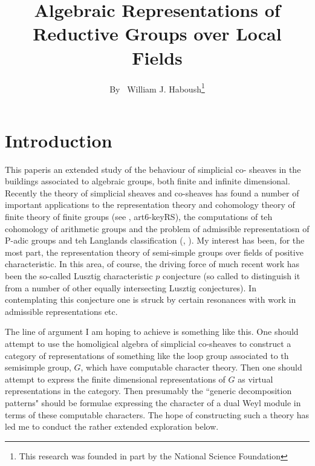 \title{Algebraic Representations of Reductive Groups over Local Fields}

\author{By~ William J. Haboush\footnote{This research was founded in part by the National Science Foundation}}

\date{}
\maketitle



\section*{Introduction}

This paper\pageoriginale is an extended study of the behaviour of simplicial co- sheaves in the buildings associated to algebraic groups, both finite and infinite dimensional. Recently the theory of simplicial sheaves and co-sheaves has found a number of important applications to the representation theory and cohomology theory of finite theory of finite groups (see \cite{art6-keyT}, art6-keyRS), the computations of teh cohomology of arithmetic groups and the problem of admissible representatiosn of P-adic groups and teh Langlands classification (\cite{art6-keyCW}, \cite{art6-keyBW}). My interest has been, for the most part, the representation theory of semi-simple groups over fields of positive characteristic. In this area, of course, the driving force of much recent work has been the so-called Lusztig characteristic $p$ conjecture \cite{art6-keyL1} (so called to distinguish it from a number of other equally intersecting Lusztig conjectures). In contemplating this conjecture one is struck by certain resonances with work in admissible representations etc.

The line of argument I am hoping to achieve is something like this. One should attempt to use the homoligical algebra of simplicial co-sheaves to construct a category of representations of something like the loop group associated to th semisimple group, $G$, which have computable character theory. Then one should attempt to express the finite dimensional representations of $G$ as virtual representations in the category. Then presumably the ``generic decomposition patterns" should be formulae expressing the character of a dual Weyl module in terms of these computable characters. The hope of constructing such a theory has led me to conduct the rather extended exploration below.  

